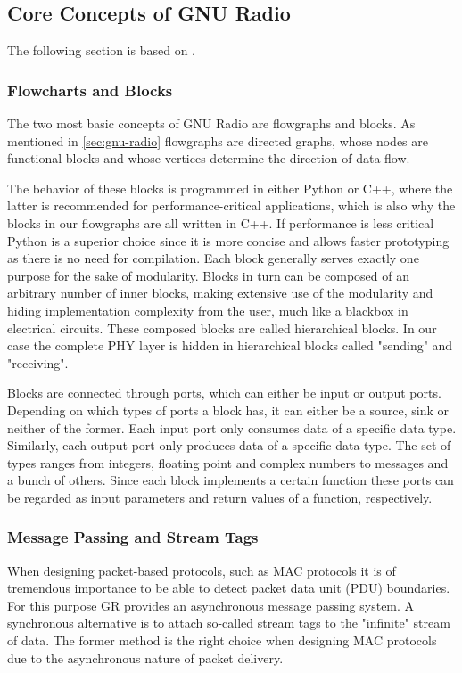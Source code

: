 \subsection{Core Concepts of GNU Radio}

The following section is based on \cite{GR1}.

\subsubsection{Flowcharts and Blocks}

The two most basic concepts of GNU Radio are flowgraphs and blocks. As mentioned in \ref{sec:gnu-radio} flowgraphs are directed graphs, whose nodes are functional blocks and whose vertices determine the direction of data flow. 

The behavior of these blocks is programmed in either Python or C++, where the latter is recommended for performance-critical applications, which is also why the blocks in our flowgraphs are all written in C++. If performance is less critical Python is a superior choice since it is more concise and allows faster prototyping as there is no need for compilation. Each block generally serves exactly one purpose for the sake of modularity. Blocks in turn can be composed of an arbitrary number of inner blocks, making extensive use of the modularity and hiding implementation complexity from the user, much like a blackbox in electrical circuits. These composed blocks are called hierarchical blocks. In our case the complete PHY layer is hidden in hierarchical blocks called "sending" and "receiving".

Blocks are connected through ports, which can either be input or output ports. Depending on which types of ports a block has, it can either be a source, sink or neither of the former. 
Each input port only consumes data of a specific data type. Similarly, each output port only produces data of a specific data type. The set of types ranges from integers, floating point and complex numbers to messages and a bunch of others. Since each block implements a certain function these ports can be regarded as input parameters and return values of a function, respectively.

\subsubsection{Message Passing and Stream Tags}

When designing packet-based protocols, such as MAC protocols it is of tremendous importance to be able to detect packet data unit (PDU) boundaries. For this purpose GR provides an asynchronous message passing system. A synchronous alternative is to attach so-called stream tags to the "infinite" stream of data. The former method is the right choice when designing MAC protocols due to the asynchronous nature of packet delivery.  

